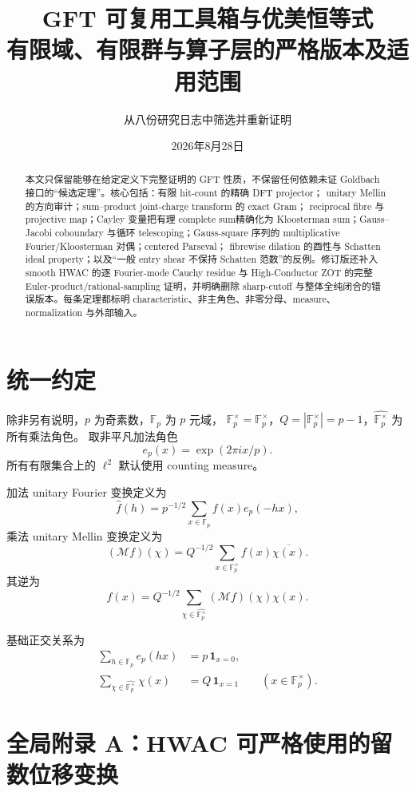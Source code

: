 \documentclass[11pt,a4paper]{ctexart}
\title{GFT 可复用工具箱与优美恒等式\\
\large 有限域、有限群与算子层的严格版本及适用范围}
\author{从八份研究日志中筛选并重新证明}
\date{2026年8月28日}
\theoremstyle{definition}
\newcommand{\F}{\mathbb F}
\newcommand{\G}{\F_p^\times}
\newcommand{\Gh}{\widehat{\G}}
\newcommand{\ep}{e_p}
\newcommand{\1}{\mathbf 1}
\begin{document}
\maketitle

\begin{abstract}
本文只保留能够在给定定义下完整证明的 GFT 性质，不保留任何依赖未证
Goldbach 接口的“候选定理”。核心包括：有限 hit-count 的精确 DFT projector；
unitary Mellin 的方向审计；sum--product joint-charge transform 的 exact Gram；
reciprocal fibre 与 projective map；Cayley 变量把有理 complete sum精确化为
Kloosterman sum；Gauss--Jacobi coboundary 与循环 telescoping；Gauss-square
序列的 multiplicative Fourier/Kloosterman 对偶；centered Parseval；
fibrewise dilation 的酉性与 Schatten ideal property；以及“一般 entry shear
不保持 Schatten 范数”的反例。修订版还补入 smooth HWAC 的逐 Fourier-mode
Cauchy residue 与 High-Conductor ZOT 的完整 Euler-product/rational-sampling
证明，并明确删除 sharp-cutoff 与整体全纯闭合的错误版本。每条定理都标明
characteristic、非主角色、非零分母、measure、normalization 与外部输入。
\end{abstract}

\section{统一约定}

除非另有说明，$p$ 为奇素数，$\F_p$ 为 $p$ 元域，
$\G=\F_p^\times$，$Q=|\G|=p-1$，$\Gh$ 为所有乘法角色。
取非平凡加法角色
\[
\ep(x)=\exp(2\pi i x/p).
\]
所有有限集合上的 $\ell^2$ 默认使用 counting measure。

加法 unitary Fourier 变换定义为
\[
\widehat f(h)=p^{-1/2}\sum_{x\in\F_p}f(x)\ep(-hx),
\tag{1.1}
\]
乘法 unitary Mellin 变换定义为
\[
(\mathcal M f)(\chi)=Q^{-1/2}\sum_{x\in\G}f(x)\overline{\chi(x)}.
\tag{1.2}
\]
其逆为
\[
f(x)=Q^{-1/2}\sum_{\chi\in\Gh}(\mathcal Mf)(\chi)\chi(x).
\tag{1.3}
\]

基础正交关系为
\begin{align}
\sum_{h\in\F_p}\ep(hx)&=p\,\1_{x=0},                 \tag{1.4}\\
\sum_{\chi\in\Gh}\chi(x)&=Q\,\1_{x=1}\qquad(x\in\G). \tag{1.5}
\end{align}

\section*{全局附录 A：HWAC 可严格使用的留数位移变换}
\end{document}
